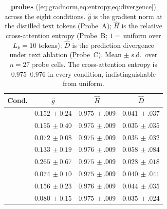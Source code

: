 \begin{table}[t]
\centering
\caption{\textbf{\Aurora{} probes}
(\cref{eq:gradnorm,eq:entropy,eq:divergence}) across the eight
conditions.  $\widehat g$ is the gradient norm at the distilled
text tokens (Probe~A); $\widehat H$ is the relative cross-attention
entropy (Probe~B; $1\!=\!$\,uniform over $L_k\!=\!10$ tokens);
$\widehat D$ is the prediction divergence under text ablation
(Probe~C).  Mean $\pm$ s.d.\ over $n=27$ probe cells.  The
cross-attention entropy is $0.975$--$0.976$ in every condition,
indistinguishable from uniform.}
\label{tab:probes}
\small
\setlength{\tabcolsep}{8pt}
\renewcommand{\arraystretch}{1.18}
\begin{tabular}{l c c c}
\toprule
\textbf{Cond.} & $\widehat g$ & $\widehat H$ & $\widehat D$ \\
\midrule
\Cone{}    & $0.152{\scriptstyle\,\pm 0.24}$ & $0.975{\scriptstyle\,\pm.009}$ & $0.041{\scriptstyle\,\pm.037}$ \\
\Cthree{}  & $0.155{\scriptstyle\,\pm 0.40}$ & $0.975{\scriptstyle\,\pm.009}$ & $0.035{\scriptstyle\,\pm.035}$ \\
\Cfour{}   & $0.072{\scriptstyle\,\pm 0.08}$ & $0.975{\scriptstyle\,\pm.009}$ & $0.035{\scriptstyle\,\pm.032}$ \\
\Ceight{}  & $0.133{\scriptstyle\,\pm 0.19}$ & $0.976{\scriptstyle\,\pm.009}$ & $0.058{\scriptstyle\,\pm.084}$ \\
\Cnine{}   & $0.265{\scriptstyle\,\pm 0.67}$ & $0.975{\scriptstyle\,\pm.009}$ & $0.028{\scriptstyle\,\pm.018}$ \\
\Ctwo{}    & $0.074{\scriptstyle\,\pm 0.10}$ & $0.975{\scriptstyle\,\pm.009}$ & $0.040{\scriptstyle\,\pm.041}$ \\
\Cfive{}   & $0.156{\scriptstyle\,\pm 0.23}$ & $0.976{\scriptstyle\,\pm.009}$ & $0.044{\scriptstyle\,\pm.035}$ \\
\Csix{}    & $0.080{\scriptstyle\,\pm 0.15}$ & $0.975{\scriptstyle\,\pm.009}$ & $0.035{\scriptstyle\,\pm.024}$ \\
\bottomrule
\end{tabular}
\end{table}
